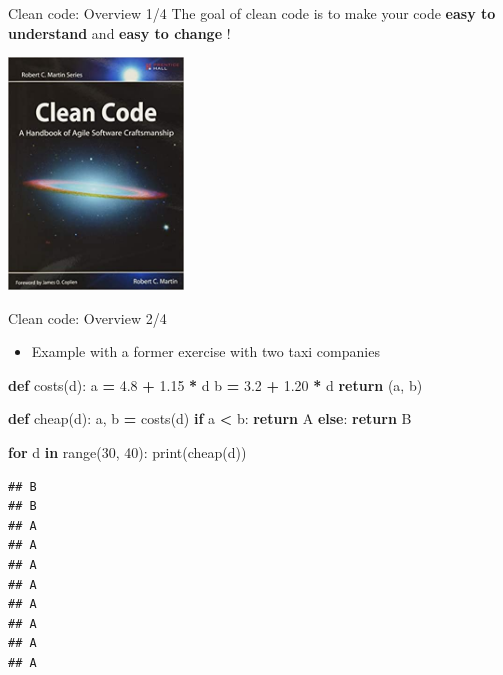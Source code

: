 \documentclass[
  8pt,
  ignorenonframetext,
]{beamer}
\newenvironment{Shaded}{\begin{snugshade}}{\end{snugshade}}
\newcommand{\BuiltInTok}[1]{#1}
\newcommand{\ControlFlowTok}[1]{\textcolor[rgb]{0.13,0.29,0.53}{\textbf{#1}}}
\newcommand{\DecValTok}[1]{\textcolor[rgb]{0.00,0.00,0.81}{#1}}
\newcommand{\FloatTok}[1]{\textcolor[rgb]{0.00,0.00,0.81}{#1}}
\newcommand{\KeywordTok}[1]{\textcolor[rgb]{0.13,0.29,0.53}{\textbf{#1}}}
\newcommand{\NormalTok}[1]{#1}
\newcommand{\OperatorTok}[1]{\textcolor[rgb]{0.81,0.36,0.00}{\textbf{#1}}}
\newcommand{\StringTok}[1]{\textcolor[rgb]{0.31,0.60,0.02}{#1}}
\providecommand{\tightlist}{%
  \setlength{\itemsep}{0pt}\setlength{\parskip}{0pt}}
\begin{document}
\begin{frame}{Clean code: Overview 1/4}
\protect\hypertarget{clean-code-overview-14}{}
The goal of clean code is to make your code \textbf{easy to understand}
and \textbf{easy to change} !

\includegraphics[width=0.35\textwidth,height=\textheight]{clean_code.png}
\end{frame}

\begin{frame}[fragile]{Clean code: Overview 2/4}
\protect\hypertarget{clean-code-overview-24}{}
\begin{itemize}
\tightlist
\item
  Example with a former exercise with two taxi companies
\end{itemize}

\begin{Shaded}
\begin{Highlighting}[]
\KeywordTok{def}\NormalTok{ costs(d):}
\NormalTok{    a }\OperatorTok{=} \FloatTok{4.8} \OperatorTok{+} \FloatTok{1.15} \OperatorTok{*}\NormalTok{ d}
\NormalTok{    b }\OperatorTok{=} \FloatTok{3.2} \OperatorTok{+} \FloatTok{1.20} \OperatorTok{*}\NormalTok{ d}
    \ControlFlowTok{return}\NormalTok{ (a, b)}

\KeywordTok{def}\NormalTok{ cheap(d):}
\NormalTok{    a, b }\OperatorTok{=}\NormalTok{ costs(d)}
    \ControlFlowTok{if}\NormalTok{ a }\OperatorTok{\textless{}}\NormalTok{ b:}
        \ControlFlowTok{return} \StringTok{\textquotesingle{}A\textquotesingle{}}
    \ControlFlowTok{else}\NormalTok{:}
        \ControlFlowTok{return} \StringTok{\textquotesingle{}B\textquotesingle{}}

\ControlFlowTok{for}\NormalTok{ d }\KeywordTok{in} \BuiltInTok{range}\NormalTok{(}\DecValTok{30}\NormalTok{, }\DecValTok{40}\NormalTok{):}
    \BuiltInTok{print}\NormalTok{(cheap(d))}
\end{Highlighting}
\end{Shaded}

\begin{verbatim}
## B
## B
## A
## A
## A
## A
## A
## A
## A
## A
\end{verbatim}
\end{frame}
\end{document}
